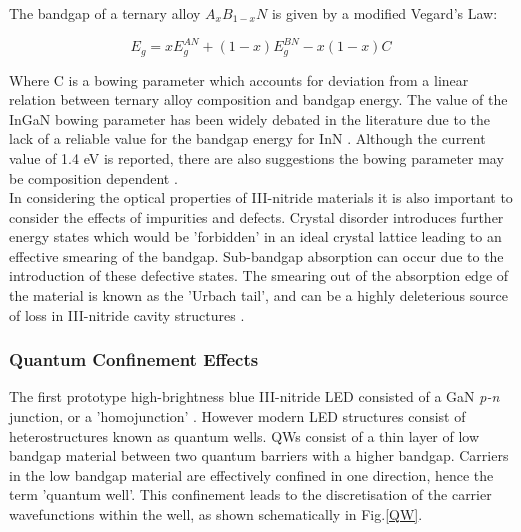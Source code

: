 The bandgap of a ternary alloy $A_{x}B_{1-x}N$ is given by a modified Vegard's Law:

\begin{equation}
E_{g} = x E_{g}^{AN} + (1-x)E_{g}^{BN}-x(1-x)C
\end{equation}

Where C is a bowing parameter which accounts for deviation from a linear relation between ternary alloy composition and bandgap energy. The value of the InGaN bowing parameter has been widely debated in the literature due to the lack of a reliable value for the bandgap energy for InN \cite{Vurgaftman2003}. Although the current value of 1.4 eV is reported, there are also suggestions the bowing parameter may be composition dependent \cite{Wu2002,McCluskey2003,Moses2010}.\\
In considering the optical properties of III-nitride materials it is also important to consider the effects of impurities and defects. Crystal disorder introduces further energy states which would be 'forbidden' in an ideal crystal lattice leading to an effective smearing of the bandgap. Sub-bandgap absorption can occur due to the introduction of these defective states. The smearing out of the absorption edge of the material is known as the 'Urbach tail', and can be a highly deleterious source of loss in III-nitride cavity structures \cite{Puchtler2015}. 

\subsubsection{Quantum Confinement Effects}
\label{QW section}

The first prototype high-brightness blue III-nitride LED consisted of a GaN {\it p-n} junction, or a 'homojunction' \cite{Nakamura1991}. However modern LED structures consist of heterostructures known as quantum wells. QWs consist of a thin layer of low bandgap material between two quantum barriers with a higher bandgap. Carriers in the low bandgap material are effectively confined in one direction, hence the term 'quantum well'. This confinement leads to the discretisation of the carrier wavefunctions within the well, as shown schematically in Fig.\ref{QW}.

